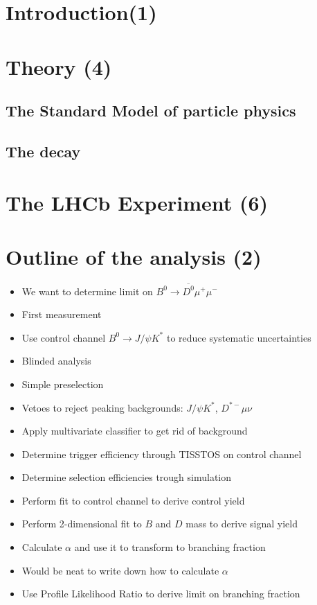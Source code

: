 
\chapter{Introduction(1)}

\chapter{Theory (4)}

\section{The Standard Model of particle physics}

\section[The decay \decay]{The decay \bolddecay}

\chapter{The LHCb Experiment (6)}

\chapter{Outline of the analysis (2)}

\begin{itemize}
  \item We want to determine limit on $B^0\to \overline{D^0}μ^+μ^-$
  \item First measurement
  \item Use control channel $B^0\to J/ψ K^*$ to reduce systematic uncertainties
  \item Blinded analysis
  \item Simple preselection
  \item Vetoes to reject peaking backgrounds: $J/ψ K^*$, $D^{*-}μν$
  \item Apply multivariate classifier to get rid of background
  \item Determine trigger efficiency through TISSTOS on control channel
  \item Determine selection efficiencies trough simulation
  \item Perform fit to control channel to derive control yield
  \item Perform 2-dimensional fit to $B$ and $D$ mass to derive signal yield
  \item Calculate $α$ and use it to transform to branching fraction
  \item Would be neat to write down how to calculate $α$
  \item Use Profile Likelihood Ratio to derive limit on branching fraction
\end{itemize}

